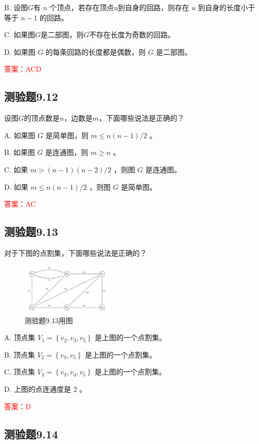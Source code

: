 \documentclass[UTF8, heading=true]{ctexart}
\begin{document}
B. 设图$G$有 $n$ 个顶点，若存在顶点u到自身的回路，则存在 $u$ 到自身的长度小于等于 $n-1$ 的回路。

C. 如果图$G$是二部图，则$G$不存在长度为奇数的回路。

D. 如果图 $G$ 的每条回路的长度都是偶数，则 $G$ 是二部图。

\textcolor{red}{答案：ACD}

\subsection{测验题9.12}

设图$G$的顶点数是$n$，边数是$m$，下面哪些说法是正确的？

A. 如果图 $G$ 是简单图，则 $m \leq n(n-1) / 2$ 。

B. 如果图 $G$ 是连通图，则 $m \geq n$ 。

C. 如果 $m>(n-1)(n-2) / 2$ ，则图 $G$ 是连通图。

D. 如果 $m \leq n(n-1) / 2$ ，则图 $G$ 是简单图。

\textcolor{red}{答案：AC}

\subsection{测验题9.13}

对于下图的点割集，下面哪些说法是正确的？

\begin{figure}[H]
    \centering
    \includegraphics[width=0.4\textwidth]{9.13.jpg} %
    \caption{测验题9.13用图}
\end{figure}

A. 顶点集 $V_1=\left\{v_2, v_3, v_5\right\}$ 是上图的一个点割集。

B. 顶点集 $V_2=\left\{v_3, v_5\right\}$ 是上图的一个点割集。

C. 顶点集 $V_3=\left\{v_3, v_4, v_5\right\}$ 是上图的一个点割集。

D. 上图的点连通度是 2 。

\textcolor{red}{答案：D}

\subsection{测验题9.14}
\end{document}
